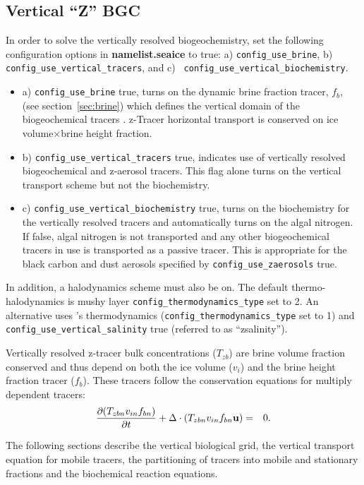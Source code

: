 \subsection{Vertical ``Z'' BGC}
\label{sec:zbgc}
In order to solve the vertically resolved biogeochemistry, set the
following configuration options in {\bf namelist.seaice} to true: a)
{\tt config\_use\_brine}, b) {\tt config\_use\_vertical\_tracers}, and
\newline c) {\tt
  config\_use\_vertical\_biochemistry}.
\begin{itemize}
\item a) {\tt config\_use\_brine} true, turns on the dynamic brine
  fraction tracer, $f_b$, (see section~\ref{sec:brine}) which defines the vertical domain of the
  biogeochemical tracers .  z-Tracer horizontal transport is conserved on ice
  volume$\times$brine height fraction.
\item b) {\tt config\_use\_vertical\_tracers} true, indicates use of vertically resolved
  biogeochemical and z-aerosol tracers.  This flag alone turns on the
  vertical transport scheme but not the biochemistry.
\item c) {\tt config\_use\_vertical\_biochemistry} true, turns on the biochemistry for the
  vertically resolved tracers and automatically turns on the algal
  nitrogen. If false, algal nitrogen is not transported and any other biogeochemical tracers in use is
  transported as a passive tracer.  This is appropriate for the black
  carbon and dust aerosols specified by {\tt config\_use\_zaerosols} true.
\end{itemize}
In addition, a halodynamics scheme must also be on.  The default
thermo-halodynamics is mushy layer {\tt config\_thermodynamics\_type} set to 2.  An
alternative uses \cite{BL99}'s thermodynamics ({\tt config\_thermodynamics\_type} set
to 1) and {\tt config\_use\_vertical\_salinity} true (referred to as ``zsalinity'').

Vertically resolved z-tracer bulk concentrations ($T_{zb}$) are  brine volume fraction conserved and thus
depend on both the ice volume ($v_{i}$) and the brine height fraction tracer ($f_b$).   These tracers follow the conservation equations for multiply dependent
tracers:
\begin{eqnarray}
\label{eqn:zbgc_tracer_thickness_cons}
\frac{\partial (T_{zbn} v_{in}f_{bn})}{\partial t} + \Delta \cdot (T_{zbn} v_{in}f_{bn} {\bf u}) & = & 0.
\end{eqnarray}

The following sections describe the vertical biological grid, the
vertical transport equation for mobile tracers, the partitioning of
tracers into  mobile and stationary fractions and the
biochemical reaction equations.
